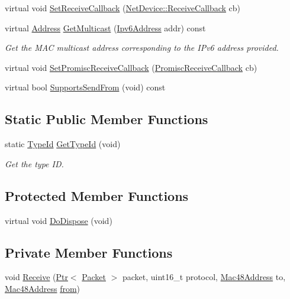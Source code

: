 \begin{DoxyCompactItemize}
\item 
virtual void \hyperlink{classns3_1_1LoopbackNetDevice_ab628a992340b0530c0777d048b84ee0f}{Set\+Receive\+Callback} (\hyperlink{classns3_1_1NetDevice_ad5e5e1ca187472bc2ba99575d8def568}{Net\+Device\+::\+Receive\+Callback} cb)
\item 
virtual \hyperlink{classns3_1_1Address}{Address} \hyperlink{classns3_1_1LoopbackNetDevice_a5533dda5ad3085b3597aca7d9b05ab38}{Get\+Multicast} (\hyperlink{classns3_1_1Ipv6Address}{Ipv6\+Address} addr) const 
\begin{DoxyCompactList}\small\item\em Get the M\+AC multicast address corresponding to the I\+Pv6 address provided. \end{DoxyCompactList}\item 
virtual void \hyperlink{classns3_1_1LoopbackNetDevice_a789063a46797d9c03d7abeb24f0891b1}{Set\+Promisc\+Receive\+Callback} (\hyperlink{classns3_1_1NetDevice_a427225795919f26c414bee2ea3f31ed2}{Promisc\+Receive\+Callback} cb)
\item 
virtual bool \hyperlink{classns3_1_1LoopbackNetDevice_a7dc18fb68db1cf88cbad276cb674083d}{Supports\+Send\+From} (void) const 
\end{DoxyCompactItemize}
\subsection*{Static Public Member Functions}
\begin{DoxyCompactItemize}
\item 
static \hyperlink{classns3_1_1TypeId}{Type\+Id} \hyperlink{classns3_1_1LoopbackNetDevice_a93128f30064bc62b6b8806c8584de160}{Get\+Type\+Id} (void)
\begin{DoxyCompactList}\small\item\em Get the type ID. \end{DoxyCompactList}\end{DoxyCompactItemize}
\subsection*{Protected Member Functions}
\begin{DoxyCompactItemize}
\item 
virtual void \hyperlink{classns3_1_1LoopbackNetDevice_ac2f5d5fbbf5c0f88550ea181b9107f34}{Do\+Dispose} (void)
\end{DoxyCompactItemize}
\subsection*{Private Member Functions}
\begin{DoxyCompactItemize}
\item 
void \hyperlink{classns3_1_1LoopbackNetDevice_a2b5c5f64267ba906d149ab89d2831d34}{Receive} (\hyperlink{classns3_1_1Ptr}{Ptr}$<$ \hyperlink{classns3_1_1Packet}{Packet} $>$ packet, uint16\+\_\+t protocol, \hyperlink{classns3_1_1Mac48Address}{Mac48\+Address} to, \hyperlink{classns3_1_1Mac48Address}{Mac48\+Address} \hyperlink{lte__amc_8m_a1b4c81ff74eb1a626b5ade44c81004b3}{from})
\end{DoxyCompactItemize}
